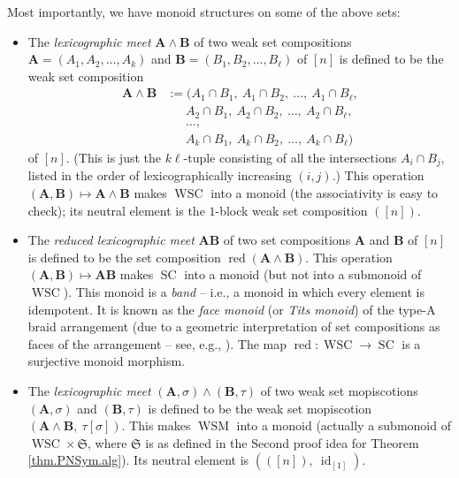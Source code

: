 \documentclass[numbers=enddot,12pt,final,onecolumn,notitlepage]{scrartcl}%
\theoremstyle{definition}
\begin{document}
Most importantly, we have monoid structures on some of the above sets:

\begin{itemize}
\item The \emph{lexicographic meet} $\mathbf{A}\wedge\mathbf{B}$ of two weak
set compositions $\mathbf{A}=\left(  A_{1},A_{2},\ldots,A_{k}\right)  $ and
$\mathbf{B}=\left(  B_{1},B_{2},\ldots,B_{\ell}\right)  $ of $\left[
n\right]  $ is defined to be the weak set composition
\begin{align*}
\mathbf{A}\wedge\mathbf{B}  &  :=(A_{1}\cap B_{1},\ A_{1}\cap B_{2}%
,\ \ldots,\ A_{1}\cap B_{\ell},\\
&  \ \ \ \ \ \ \ A_{2}\cap B_{1},\ A_{2}\cap B_{2},\ \ldots,\ A_{2}\cap
B_{\ell},\\
&  \ \ \ \ \ \ \ \ldots,\\
&  \ \ \ \ \ \ \ A_{k}\cap B_{1},\ A_{k}\cap B_{2},\ \ldots,\ A_{k}\cap
B_{\ell})
\end{align*}
of $\left[  n\right]  $. (This is just the $k\ell$-tuple consisting of all the
intersections $A_{i}\cap B_{j}$, listed in the order of lexicographically
increasing $\left(  i,j\right)  $.) This operation $\left(  \mathbf{A}%
,\mathbf{B}\right)  \mapsto\mathbf{A}\wedge\mathbf{B}$ makes
$\operatorname*{WSC}$ into a monoid (the associativity is easy to check); its
neutral element is the $1$-block weak set composition $\left(  \left[
n\right]  \right)  $.

\item The \emph{reduced lexicographic meet} $\mathbf{AB}$ of two set
compositions $\mathbf{A}$ and $\mathbf{B}$ of $\left[  n\right]  $ is defined
to be the set composition $\operatorname*{red}\left(  \mathbf{A}%
\wedge\mathbf{B}\right)  $. This operation $\left(  \mathbf{A},\mathbf{B}%
\right)  \mapsto\mathbf{AB}$ makes $\operatorname*{SC}$ into a monoid (but not
into a submonoid of $\operatorname*{WSC}$). This monoid is a \emph{band} --
i.e., a monoid in which every element is idempotent. It is known as the
\emph{face monoid} (or \emph{Tits monoid}) of the type-A braid arrangement
(due to a geometric interpretation of set compositions as faces of the
arrangement -- see, e.g., \cite[\S 1.2.1]{Saliol06}). The map
$\operatorname*{red}:\operatorname*{WSC}\rightarrow\operatorname*{SC}$ is a
surjective monoid morphism.

\item The \emph{lexicographic meet} $\left(  \mathbf{A},\sigma\right)
\wedge\left(  \mathbf{B},\tau\right)  $ of two weak set mopiscotions $\left(
\mathbf{A},\sigma\right)  $ and $\left(  \mathbf{B},\tau\right)  $ is defined
to be the weak set mopiscotion $\left(  \mathbf{A}\wedge\mathbf{B}%
,\ \tau\left[  \sigma\right]  \right)  $. This makes $\operatorname*{WSM}$
into a monoid (actually a submonoid of $\operatorname*{WSC}\times\mathfrak{S}%
$, where $\mathfrak{S}$ is as defined in the Second proof idea for Theorem
\ref{thm.PNSym.alg}). Its neutral element is $\left(  \left(  \left[
n\right]  \right)  ,\ \operatorname*{id}\nolimits_{\left[  1\right]  }\right)
$.


\end{itemize}
\end{document}
